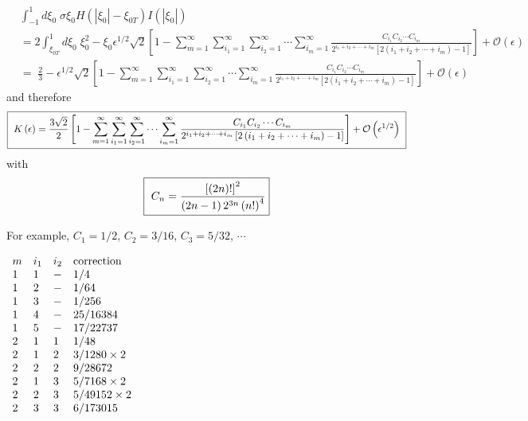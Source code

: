 \begin{align*}
&  \int_{-1}^{1}d\xi_{0}\;\sigma\xi_{0}H\left(  \left|  \xi_{0}\right|
-\xi_{0T}\right)  I\left(  \left|  \xi_{0}\right|  \right)  \\
&  =2\int_{\xi_{0T}}^{1}d\xi_{0}\;\xi_{0}^{2}-\xi_{0}\epsilon^{1/2}\sqrt
{2}\left[  1-\sum_{m=1}^{\infty}\sum_{i_{1}=1}^{\infty}\sum_{i_{2}=1}^{\infty
}\cdots\sum_{i_{m}=1}^{\infty}\frac{C_{i_{1}}C_{i_{2}}\cdots C_{i_{m}}%
}{2^{i_{1}+i_{2}+\cdots+i_{m}}\left[  2\left(  i_{1}+i_{2}+\cdots
+i_{m}\right)  -1\right]  }\right]  +\mathcal{O}\left(  \epsilon\right)  \\
&  =\;\frac{2}{3}-\epsilon^{1/2}\sqrt{2}\left[  1-\sum_{m=1}^{\infty}%
\sum_{i_{1}=1}^{\infty}\sum_{i_{2}=1}^{\infty}\cdots\sum_{i_{m}=1}^{\infty
}\frac{C_{i_{1}}C_{i_{2}}\cdots C_{i_{m}}}{2^{i_{1}+i_{2}+\cdots+i_{m}}\left[
2\left(  i_{1}+i_{2}+\cdots+i_{m}\right)  -1\right]  }\right]  +\mathcal{O}%
\left(  \epsilon\right)
\end{align*}
and therefore%
\begin{equation}
\fbox{ $\displaystyle   K\left(  \epsilon\right)
=\frac{3\sqrt{2}}{2}\left[  1-\sum_{m=1}^{\infty
}\sum_{i_{1}=1}^{\infty}\sum_{i_{2}=1}^{\infty}\cdots\sum_{i_{m}=1}^{\infty
}\frac{C_{i_{1}}C_{i_{2}}\cdots
C_{i_{m}}}{2^{i_{1}+i_{2}+\cdots+i_{m}}\left[
2\left(  i_{1}+i_{2}+\cdots+i_{m}\right)  -1\right]  }\right]  +\mathcal{O}%
\left(  \epsilon^{1/2}\right)$ }  \label{kappa}
\end{equation}
with%
\[\fbox{ $\displaystyle
C_{n}=\frac{\left[  \left(  2n\right)  !\right]  ^{2}}{\left(
2n-1\right)
2^{3n}\left(  n!\right)  ^{4}}$}%
\]

For example, $C_{1}=1/2$, $C_{2}=3/16$, $C_{3}=5/32$, $\cdots$

\begin{center}
$%
\begin{array}
[c]{llll}%
m & i_{1} & i_{2} & \text{correction}\\
1 & 1 & - & 1/4\\
1 & 2 & - & 1/64\\
1 & 3 & - & 1/256\\
1 & 4 & - & 25/16384\\
1 & 5 & - & 17/22737\\
2 & 1 & 1 & 1/48\\
2 & 1 & 2 & 3/1280\times2\\
2 & 2 & 2 & 9/28672\\
2 & 1 & 3 & 5/7168\times2\\
2 & 2 & 3 & 5/49152\times2\\
2 & 3 & 3 & 6/173015
\end{array}
$
\end{center}

